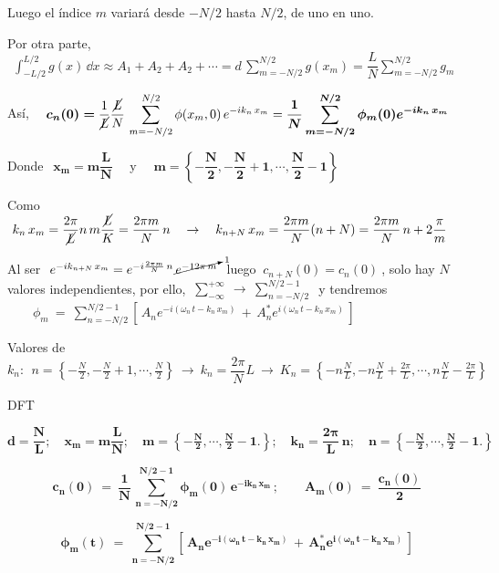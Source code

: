 Luego el índice $m$ variará desde $-N/2$ hasta $N/2$, de uno en uno.

Por otra parte, $\ \ \displaystyle \int_{-L/2}^{L/2} g(x)\, \dd x \approx A_1+A_2+A_2+ \cdots = d\, \sum_{m=-N/2}^{N/2} g(x_m)= \dfrac L N \sum_{m=-N/2}^{N/2} g_m$ 

Así, $\quad \displaystyle  \boldsymbol{ c_n(0)= } \dfrac 1 {\cancel{L}} \dfrac {\cancel{L}} N \, \sum_{m=-N/2}^{N/2} \phi(x_m,0)\, e^{-ik_n\, x_m} = \boldsymbol{ \dfrac 1 N \sum_{m=-N/2}^{N/2} \phi_m(0) e^{-ik_n\, x_m} }$


Donde $\ \ \boldsymbol{x_m=m\dfrac L N }\quad $ y $\quad \boldsymbol{m= \left\{-\dfrac N 2 , -\dfrac N 2 + 1 , \cdots , \dfrac N 2 - 1 \right\}}$


Como $\ k_n \, x_m=\dfrac {2  \pi }{\cancel{L}} n \, m \dfrac{\cancel{L}}K=\dfrac{2\pi m}{N}\, n \quad \to \quad   k_{n+N}\, x_m=\dfrac{2\pi m}{N}(n+N)=\dfrac{2\pi m}{N}\, n + 2 \dfrac \pi m$

Al ser $\ e^{-ik_{n+N}\, x_m}=e^{-i\frac{2\pi m}{N}\, n} \, \cancelto{1}{e^{-12\pi \, m}} \ $ luego $\ c_{n+N}(0)=c_n(0) \ $, solo hay $N$ valores independientes, por ello, $\ \displaystyle \sum_{-\infty}^{+\infty} \ \to \ \sum_{n=-N/2}^{N/2-1}\ $  y tendremos
$\qquad \displaystyle \phi_m \ = \  \sum_{n=-N/2}^{N/2-1} \left[\, A_n e^{-i(\omega_n \, t-k_n \, x_m)} \, + \, A_n^* e^{i(\omega_n \, t-k_n \, x_m)}   \, \right]$

Valores de $k_n:\ \  n= \left\{-\frac N 2, -\frac N 2 +1, \cdots , \frac N 2 \right\} \  \to \ k_n=\dfrac{2\pi}N L \ \to \ K_n= \left\{ -n\frac N L , -n\frac N L + \frac{2\pi}L, \cdots, n\frac N L - \frac{2\pi}L  \right\} $

\vspace{5mm}

\begin{myblock}{DFT}

\begin{small}
$\boldsymbol{ d=\dfrac N L;\quad x_m=m\dfrac L N; \quad m=\left\{ -\frac N 2 , \cdots , \frac N 2 - 1. \right\}; \quad k_n=\dfrac{2\pi}L \, n; \quad  n=\left\{ -\frac N 2 , \cdots , \frac N 2 - 1. \right\}	}$ \end{small}

\vspace{3mm}
$$\boldsymbol{  c_n(0) \ = \ \dfrac 1 N \, \displaystyle \sum_{n=-N/2}^{N/2-1} \phi_m(0)\, e^{-ik_n\, x_m} \, ; \qquad A_m(0)\ = \ \dfrac{c_n(0)}2 }$$

\vspace{3mm}
$$\boldsymbol{  \phi_m(t) \ = \ \displaystyle \sum_{n=-N/2}^{N/2-1} \left[\, A_n e^{-i(\omega_n \, t-k_n \, x_m)} \, + \, A_n^* e^{i(\omega_n \, t-k_n \, x_m)}   \, \right]}$$

\end{myblock}


